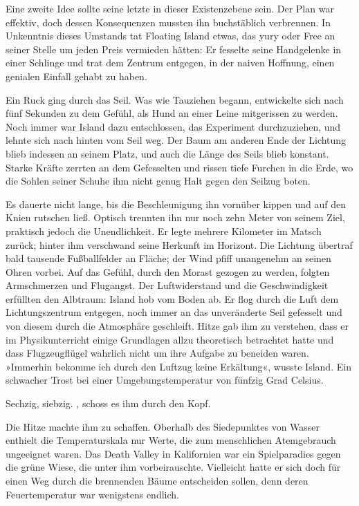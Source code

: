Eine zweite Idee sollte seine letzte in dieser Existenzebene sein. Der Plan war effektiv, doch dessen Konsequenzen mussten ihn buchstäblich verbrennen. In Unkenntnis dieses Umstands tat Floating Island etwas, das yury oder Free an seiner Stelle um jeden Preis vermieden hätten: Er fesselte seine Handgelenke in einer Schlinge und trat dem Zentrum entgegen, in der naiven Hoffnung, einen genialen Einfall gehabt zu haben.

Ein Ruck ging durch das Seil. Was wie Tauziehen begann, entwickelte sich nach fünf Sekunden zu dem Gefühl, als Hund an einer Leine mitgerissen zu werden. Noch immer war Island dazu entschlossen, das Experiment durchzuziehen, und lehnte sich nach hinten vom Seil weg. Der Baum am anderen Ende der Lichtung blieb indessen an seinem Platz, und auch die Länge des Seils blieb konstant. Starke Kräfte zerrten an dem Gefesselten und rissen tiefe Furchen in die Erde, wo die Sohlen seiner Schuhe ihm nicht genug Halt gegen den Seilzug boten.

Es dauerte nicht lange, bis die Beschleunigung ihn vornüber kippen und auf den Knien rutschen ließ. Optisch trennten ihn nur noch zehn Meter von seinem Ziel, praktisch jedoch die Unendlichkeit. Er legte mehrere Kilometer im Matsch zurück; hinter ihm verschwand seine Herkunft im Horizont. Die Lichtung übertraf bald tausende Fußballfelder an Fläche; der Wind pfiff unangenehm an seinen Ohren vorbei. Auf das Gefühl, durch den Morast gezogen zu werden, folgten Armschmerzen und Flugangst. Der Luftwiderstand und die Geschwindigkeit erfüllten den Albtraum: Island hob vom Boden ab. Er flog durch die Luft dem Lichtungszentrum entgegen, noch immer an das unveränderte Seil gefesselt und von diesem durch die Atmosphäre geschleift. Hitze gab ihm zu verstehen, dass er im Physikunterricht einige Grundlagen allzu theoretisch betrachtet hatte und dass Flugzeugflügel wahrlich nicht um ihre Aufgabe zu beneiden waren. »Immerhin bekomme ich durch den Luftzug keine Erkältung«, wusste Island. Ein schwacher Trost bei einer Umgebungstemperatur von fünfzig Grad Celsius.

Sechzig, siebzig. , schoss es ihm durch den Kopf. 

Die Hitze machte ihm zu schaffen. Oberhalb des Siedepunktes von Wasser enthielt die Temperaturskala nur Werte, die zum menschlichen Atemgebrauch ungeeignet waren. Das Death Valley in Kalifornien war ein Spielparadies gegen die grüne Wiese, die unter ihm vorbeirauschte. Vielleicht hatte er sich doch für einen Weg durch die brennenden Bäume entscheiden sollen, denn deren Feuertemperatur war wenigstens endlich.


